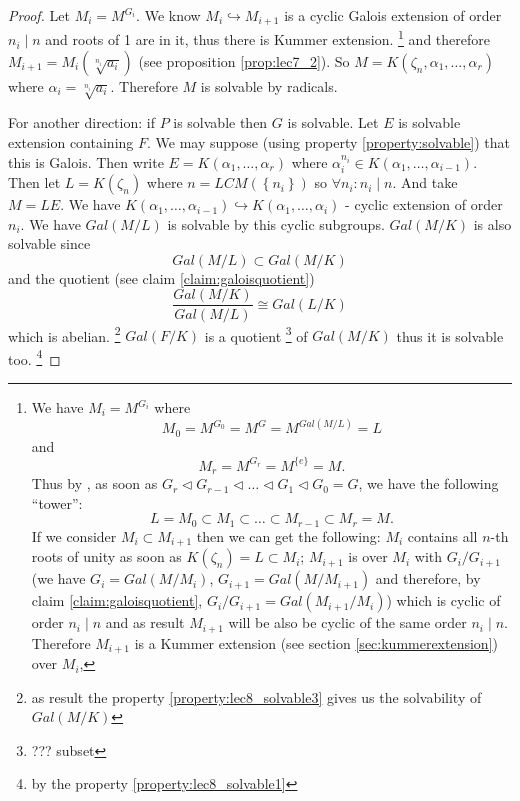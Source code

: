 \begin{theorem}
\begin{proof}
    Let $M_i = M^{G_i}$. We know $M_i \hookrightarrow M_{i+1}$ is a
    cyclic Galois extension of order $n_i \mid n$ and roots of 1 are
    in it, thus there is Kummer extension.
    \footnote{
      We have $M_i = M^{G_i}$ where
      \[
      M_0 = M^{G_0} = M^G = M^{Gal\left(M/L\right)} = L
      \]
      and
      \[
      M_r = M^{G_r} = M^{\{e\}} = M.
      \]
      Thus by ,
      as soon as
      $G_r \triangleleft G_{r-1} \triangleleft \dots \triangleleft G_1
      \triangleleft G_0 = G$,
      we have the
      following ``tower'':
      \[
      L = M_0 \subset M_1 \subset \dots \subset M_{r-1} \subset M_r = M.
      \]
      If we consider $M_i \subset M_{i+1}$ then we can get the
      following: $M_i$ contains all $n$-th roots of unity as soon as
      $K\left(\zeta_n\right) = L \subset M_i$; $M_{i+1}$ is
       over $M_i$ with
       $G_i/G_{i+1}$
      (we have $G_i = Gal\left(M/M_i\right)$,
      $G_{i+1} = Gal\left(M/M_{i+1}\right)$ and therefore, by claim
      \ref{claim:galoisquotient}, 
      $G_i/G_{i+1} = Gal\left(M_{i+1}/M_i\right)$)
      which is cyclic of order
      $n_i \mid n$ and as
      result $M_{i+1}$ will be also be cyclic of the same order $n_i
      \mid n$. Therefore $M_{i+1}$ is a Kummer extension 
      (see section \ref{sec:kummerextension}) over $M_i$,
    }
    and therefore
    $M_{i+1} = M_i\left(\sqrt[n_i]{a_i}\right)$ (see proposition
    \ref{prop:lec7_2}).
    So $M = K\left(\zeta_n, \alpha_1, \dots, \alpha_r\right)$ where
    $\alpha_i = \sqrt[n_i]{a_i}$. Therefore $M$ is solvable by
    radicals.

    For another direction: if $P$ is solvable then $G$ is
    solvable. Let $E$ is solvable extension containing $F$. We may
    suppose (using property \ref{property:solvable}) that this is Galois.
    Then write
    $E = K\left(\alpha_1, \dots, \alpha_r\right)$ where
    $\alpha_i^{n_i} \in K\left(\alpha_1, \dots,
    \alpha_{i-1}\right)$. Then let $L = K\left(\zeta_n\right)$
    where $n = LCM\left(\left\{n_i\right\}\right)$ so
    $\forall n_i: n_i \mid n$. And
    take $M = LE$. We have
    $K\left(\alpha_1, \dots, \alpha_{i-1}\right) \hookrightarrow
    K\left(\alpha_1, \dots, \alpha_i\right)$ - cyclic extension of
    order $n_i$. We have $Gal\left(M/L\right)$ is solvable by this
    cyclic subgroups. $Gal\left(M/K\right)$ is also solvable since
    \[
    Gal\left(M/L\right) \subset Gal\left(M/K\right)
    \]
    and the quotient (see claim \ref{claim:galoisquotient})
    \[
    \frac{Gal\left(M/K\right)}{Gal\left(M/L\right)}
    \cong Gal\left(L/K\right)
    \]
    which is abelian.
    \footnote{
      as result the property \ref{property:lec8_solvable3} gives us
      the solvability of $Gal\left(M/K\right)$
    }
    $Gal\left(F/K\right)$ is a quotient
    \footnote{
      ??? subset
    }
    of $Gal\left(M/K\right)$ thus
    it is solvable too.
    \footnote{
      by the property \ref{property:lec8_solvable1}
    }    
  \end{proof}
\end{theorem}


